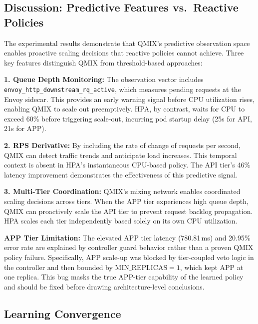 \documentclass[conference]{IEEEtran}
\begin{document}
\subsection{Discussion: Predictive Features vs.\ Reactive Policies}

The experimental results demonstrate that QMIX's predictive observation
space enables proactive scaling decisions that reactive policies cannot
achieve. Three key features distinguish QMIX from threshold-based
approaches:

\textbf{1. Queue Depth Monitoring:} The observation vector includes
\texttt{envoy\_http\_downstream\_rq\_active}, which measures pending
requests at the Envoy sidecar. This provides an early warning signal
before CPU utilization rises, enabling QMIX to scale out preemptively.
HPA, by contrast, waits for CPU to exceed 60\% before triggering
scale-out, incurring pod startup delay (25s for API, 21s for APP).

\textbf{2. RPS Derivative:} By including the rate of change of requests
per second, QMIX can detect traffic trends and anticipate load increases.
This temporal context is absent in HPA's instantaneous CPU-based policy.
The API tier's 46\% latency improvement demonstrates the effectiveness
of this predictive signal.

\textbf{3. Multi-Tier Coordination:} QMIX's mixing network enables
coordinated scaling decisions across tiers. When the APP tier experiences
high queue depth, QMIX can proactively scale the API tier to prevent
request backlog propagation. HPA scales each tier independently based
solely on its own CPU utilization.

\textbf{APP Tier Limitation:} The elevated APP tier latency (780.81\,ms)
and 20.95\% error rate are explained by controller guard behavior rather
than a proven QMIX policy failure. Specifically, APP scale-up was blocked
by tier-coupled veto logic in the controller and then bounded by
$\text{MIN\_REPLICAS}=1$, which kept APP at one replica. This bug masks
the true APP-tier capability of the learned policy and should be fixed
before drawing architecture-level conclusions.

\subsection{Learning Convergence}
\end{document}
